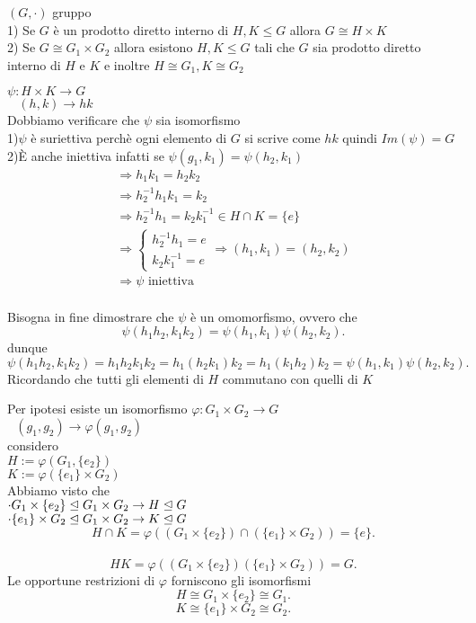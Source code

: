\documentclass[12px]{article}
\begin{document}
	  \begin{teo}
	  	$(G,\cdot)$ gruppo\\
		1) Se $G$ è un prodotto diretto interno di $H,K\leq G$ allora  $G\cong H\times K$\\
		2) Se  $G\cong G_1\times G_2$ allora esistono $H,K\leq G$ tali che $G$ sia prodotto diretto interno di $H$ e $K$ e inoltre $H\cong G_1, K\cong G_2$
	  \end{teo}
	  \begin{dimo}[1]
	  	$\psi: H\times K \rightarrow G$\\
		$\ \ \ \ (h,k) \rightarrow hk$\\
		Dobbiamo verificare che $\psi$ sia isomorfismo\\
		1)$\psi$ è suriettiva perchè ogni elemento di $G$ si scrive come $hk$ quindi $Im(\psi) = G$\\
		2)È anche iniettiva infatti se  $\psi(g_1,k_1) = \psi(h_2,k_1)$
		\begin{gather*}
			\Rightarrow h_1k_1 = h_2k_2\\
			\Rightarrow h_2^{-1}h_1k_1 = k_2\\
			\Rightarrow h_2^{-1}h_1 = k_2k_1^{-1}\in H\cap K = \{e\}\\
			\Rightarrow \begin{cases}
				h_2^{-1}h_1 = e\\
				k_2k_1^{-1} = e
			\end{cases} \Rightarrow (h_1,k_1) = (h_2,k_2)\\
			\Rightarrow \psi \text{ iniettiva}
		\end{gather*}\\
		Bisogna in fine dimostrare che $\psi$ è un omomorfismo, ovvero che\\
		\[
		\psi(h_1h_2,k_1k_2) = \psi(h_1,k_1)\psi(h_2,k_2)
		.\] 
		dunque
		\[
		\psi(h_1h_2,k_1k_2) = h_1h_2k_1k_2 = h_1(h_2k_1)k_2 = h_1(k_1h_2)k_2 = \psi(h_1,k_1)\psi(h_2,k_2)
		.\] 
		Ricordando che tutti gli elementi di $H$ commutano con quelli di $K$
	  \end{dimo}
	  \begin{dimo}[2]
	  	Per ipotesi esiste un isomorfismo
		$ \varphi: G_1\times G_2 \rightarrow G$\\
		$\ \ \ (g_1,g_2) \rightarrow \varphi(g_1,g_2)$\\
		considero\\
		$H:= \varphi(G_1,\{e_2\})$\\
		$K:= \varphi(\{e_1\}\times G_2)$ \\
		Abbiamo visto che\\
		$\cdot G_1\times \{e_2\}\trianglelefteq G_1\times G_2 \rightarrow H\trianglelefteq G$\\
		$\cdot \{e_1\}\times G_2\trianglelefteq G_1\times G_2 \rightarrow K\trianglelefteq G$ \\
		\[
			H\cap K = \varphi((G_1\times\{e_2\})\cap(\{e_1\}\times G_2)) = \{e\}
		.\] \\
		\[
			HK = \varphi((G_1\times \{e_2\})(\{e_1\}\times G_2)) = G
	.\]
	Le opportune restrizioni di $ \varphi$ forniscono gli isomorfismi
	\[
		H\cong G_1\times \{e_2\}\cong G_1
	.\] 
	\[
		K\cong \{e_1\}\times G_2\cong G_2
	.\] 

	  \end{dimo}
\end{document}
